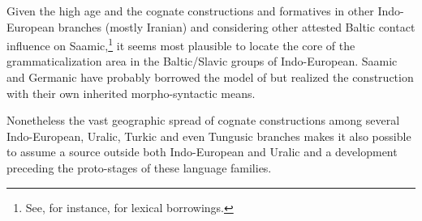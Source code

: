 Given the high age and the cognate constructions and formatives in other Indo-European branches (mostly Iranian) and considering other attested Baltic contact influence on Saamic,\footnote{See, for instance, \citealt{riesler2009} for lexical borrowings.} it seems most plausible to locate the core of the grammaticalization area in the Baltic\slash{}Slavic groups of Indo-European. Saamic and Germanic have probably borrowed the model of  but realized the construction with their own inherited morpho-syntactic means.

Nonetheless the vast geographic spread of cognate constructions among several Indo-European, Uralic, Turkic and even Tungusic branches makes it also possible to assume a source outside both Indo-European and Uralic and a development preceding the proto-stages of these language families.
